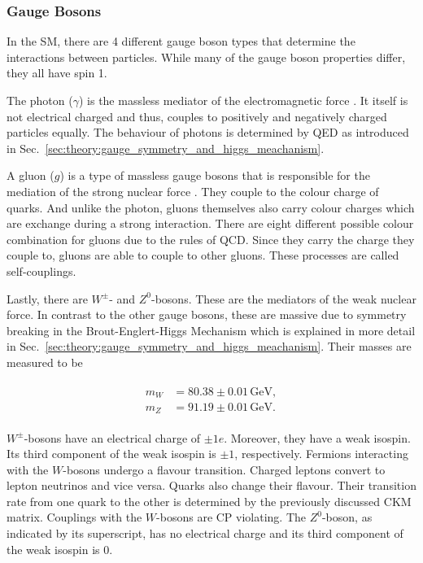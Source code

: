 \documentclass[bachelor,ngerman,english]{GAUBM}
\begin{document}
\subsubsection*{Gauge Bosons}
In the SM, there are 4 different gauge boson types \cite{theory:general_sm} that determine the interactions between particles. While many of the gauge boson properties differ, they all have spin 1.  

The photon ($\gamma$) is the massless mediator of the electromagnetic force \cite{theory:qed_02,theory:qed_04,theory:qed_05}. It itself is not electrical charged and thus, couples to positively and negatively charged particles equally. The behaviour of photons is determined by QED as introduced in Sec.~\ref{sec:theory:gauge_symmetry_and_higgs_meachanism}.

A gluon ($g$) is a type of massless gauge bosons that is responsible for the mediation of the strong nuclear force \cite{theory:qcd_01}. They couple to the colour charge of quarks. And unlike the photon, gluons themselves also carry colour charges which are exchange during a strong interaction. There are eight different possible colour combination for gluons due to the rules of QCD. Since they carry the charge they couple to, gluons are able to couple to other gluons. These processes are called self-couplings.

Lastly, there are $W^\pm$- and $Z^0$-bosons. These are the mediators of the weak nuclear force. In contrast to the other gauge bosons, these are massive due to symmetry breaking in the Brout-Englert-Higgs Mechanism which is explained in more detail in Sec.~\ref{sec:theory:gauge_symmetry_and_higgs_meachanism}. Their masses are measured to be \cite{pdg}

\begin{gather}
    \begin{aligned}
        m_W &= 80.38\pm0.01\,\text{GeV},\\
        m_Z &= 91.19\pm0.01\,\text{GeV}. 
        \label{eq:mass_wz}
    \end{aligned}
\end{gather}

$W^\pm$-bosons have an electrical charge of $\pm1e$. Moreover, they have a weak isospin. Its third component of the weak isospin is $\pm1$, respectively. Fermions interacting with the $W$-bosons undergo a flavour transition. Charged leptons convert to lepton neutrinos and vice versa. Quarks also change their flavour. Their transition rate from one quark to the other is determined by the previously discussed CKM matrix. Couplings with the $W$-bosons are CP violating. The $Z^0$-boson, as indicated by its superscript, has no electrical charge and its third component of the weak isospin is 0. 
\end{document}
